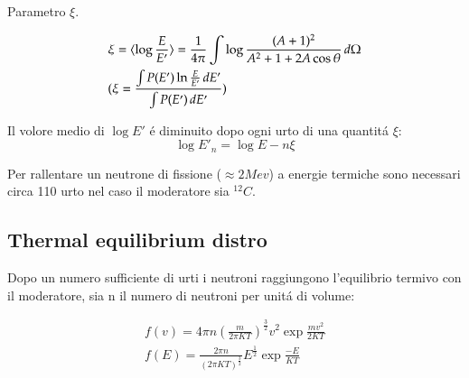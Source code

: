 Parametro $\xi$.

\begin{align*}
&\xi=\langle \log{\frac{E}{E'}} \rangle=\frac{1}{4\pi}\int\log{\frac{(A+1)^2}{A^2+1+2A\cos{\theta}}}\,d\Omega\\
&(\xi=\frac{\int P(E')\ln{\frac{E}{E'}}\,dE'}{\int P(E')\,dE'})
\end{align*}

Il volore medio di $\log{E'}$ \'e diminuito dopo ogni urto di una quantit\'a $\xi$:
\begin{equation*}
\log{E'_n}=\log{E}-n\xi
\end{equation*}

Per rallentare un neutrone di fissione ($\approx2Mev$) a energie termiche sono necessari circa 110 urto nel caso il moderatore sia $^{12}C$.

\subsection{Thermal equilibrium distro}

Dopo un numero sufficiente di urti i neutroni raggiungono l'equilibrio termivo con il moderatore,  sia n il numero di neutroni per unit\'a di volume:

\begin{align*}
f(v)=4\pi n(\frac{m}{2\pi KT})^{\frac{3}{2}}v^2\exp{\frac{mv^2}{2KT}}\\
f(E)=\frac{2\pi n}{(2\pi KT)^{\frac{3}{2}}}E^{\frac{1}{2}}\exp{\frac{-E}{KT}}
\end{align*}